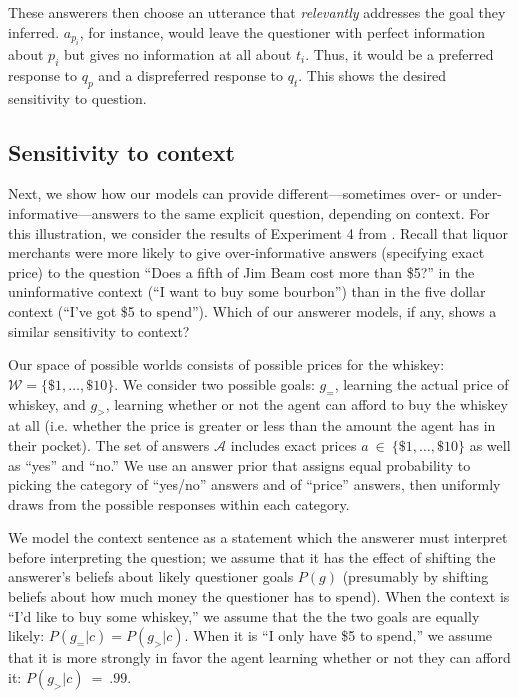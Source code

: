 \documentclass[12pt, floatsintext, jou]{apa6}
\begin{document}
These answerers then choose an utterance that \emph{relevantly} addresses the goal they inferred. $a_{p_i}$, for instance, would leave the questioner with perfect information about $p_i$ but gives no information at all about $t_i$. Thus, it would be a preferred response to $q_p$ and a dispreferred response to $q_t$. This shows the desired sensitivity to question.

\subsection{Sensitivity to context}

Next, we show how our models can provide different---sometimes over- or under-informative---answers to the same explicit question, depending on context. For this illustration, we consider the results of Experiment 4 from . Recall that liquor merchants were more likely to give over-informative answers (specifying exact price) to the question ``Does a fifth of Jim Beam cost more than \$5?'' in the uninformative context (``I want to buy some bourbon'') than in the five dollar context (``I've got \$5 to spend''). Which of our answerer models, if any, shows a similar sensitivity to context?

Our space of possible worlds consists of possible prices for the whiskey: $\mathcal{W} = \{\$1, \dots, \$10\}$. We consider two possible goals: $g_=$, learning the actual price of whiskey,  and $g_>$, learning whether or not the agent can afford to buy the whiskey at all (i.e. whether the price is greater or less than the amount the agent has in their pocket). The set of answers $\mathcal{A}$ includes exact prices $a~\in~\{\$1, \dots, \$10\}$ as well as ``yes'' and ``no.'' We use an answer prior that assigns equal probability to picking the category of ``yes/no'' answers and of ``price'' answers, then uniformly draws from the possible responses within each category. 


We model the context sentence as a statement which the answerer must interpret before interpreting the question; we assume that it has the effect of shifting the answerer's beliefs about likely questioner goals $P(g)$ (presumably by shifting beliefs about how much money the questioner has to spend). When the context is ``I'd like to buy some whiskey,'' we assume that the the two goals are equally likely: $P(g_= | c) = P(g_> | c)$. When it is ``I only have \$5 to spend,'' we assume that it is more strongly in favor the agent learning whether or not they can afford it: $P(g_> | c)~=~.99$. 
\end{document}
